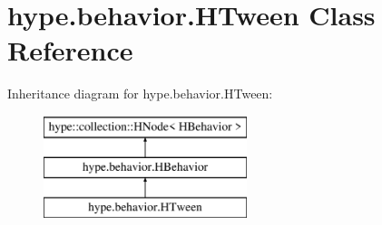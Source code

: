 \hypertarget{classhype_1_1behavior_1_1_h_tween}{\section{hype.\-behavior.\-H\-Tween Class Reference}
\label{classhype_1_1behavior_1_1_h_tween}
}
Inheritance diagram for hype.\-behavior.\-H\-Tween\-:\begin{figure}[H]
\begin{center}
\leavevmode
\includegraphics[height=3.000000cm]{classhype_1_1behavior_1_1_h_tween}
\end{center}
\end{figure}
